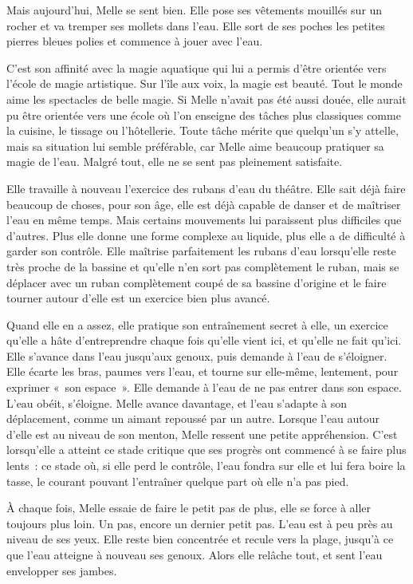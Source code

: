 Mais aujourd'hui, Melle se sent bien. Elle pose ses vêtements mouillés sur un rocher et va tremper ses mollets dans l'eau. Elle sort de ses poches les petites pierres bleues polies et commence à jouer avec l'eau.

C'est son affinité avec la magie aquatique qui lui a permis d'être orientée vers l'école de magie artistique. Sur l'île aux voix, la magie est beauté. Tout le monde aime les spectacles de belle magie. Si Melle n'avait pas été aussi douée, elle aurait pu être orientée vers une école où l'on enseigne des tâches plus classiques comme la cuisine, le tissage ou l'hôtellerie. Toute tâche mérite que quelqu'un s'y attelle, mais sa situation lui semble préférable, car Melle aime beaucoup pratiquer sa magie de l'eau. Malgré tout, elle ne se sent pas pleinement satisfaite.

Elle travaille à nouveau l'exercice des rubans d'eau du théâtre. Elle sait déjà faire beaucoup de choses, pour son âge, elle est déjà capable de danser et de maîtriser l'eau en même temps. Mais certains mouvements lui paraissent plus difficiles que d'autres. Plus elle donne une forme complexe au liquide, plus elle a de difficulté à garder son contrôle. Elle maîtrise parfaitement les rubans d'eau lorsqu'elle reste très proche de la bassine et qu'elle n'en sort pas complètement le ruban, mais se déplacer avec un ruban complètement coupé de sa bassine d'origine et le faire tourner autour d'elle est un exercice bien plus avancé.

Quand elle en a assez, elle pratique son entraînement secret à elle, un exercice qu'elle a hâte d'entreprendre chaque fois qu'elle vient ici, et qu'elle ne fait qu'ici. Elle s'avance dans l'eau jusqu'aux genoux, puis demande à l'eau de s'éloigner. Elle écarte les bras, paumes vers l'eau, et tourne sur elle-même, lentement, pour exprimer «~son espace~». Elle demande à l'eau de ne pas entrer dans son espace. L'eau obéit, s'éloigne. Melle avance davantage, et l'eau s'adapte à son déplacement, comme un aimant repoussé par un autre. Lorsque l'eau autour d'elle est au niveau de son menton, Melle ressent une petite appréhension. C'est lorsqu'elle a atteint ce stade critique que ses progrès ont commencé à se faire plus lents~: ce stade où, si elle perd le contrôle, l'eau fondra sur elle et lui fera boire la tasse, le courant pouvant l'entraîner quelque part où elle n'a pas pied.

À chaque fois, Melle essaie de faire le petit pas de plus, elle se force à aller toujours plus loin. Un pas, encore un dernier petit pas. L'eau est à peu près au niveau de ses yeux. Elle reste bien concentrée et recule vers la plage, jusqu'à ce que l'eau atteigne à nouveau ses genoux. Alors elle relâche tout, et sent l'eau envelopper ses jambes.

